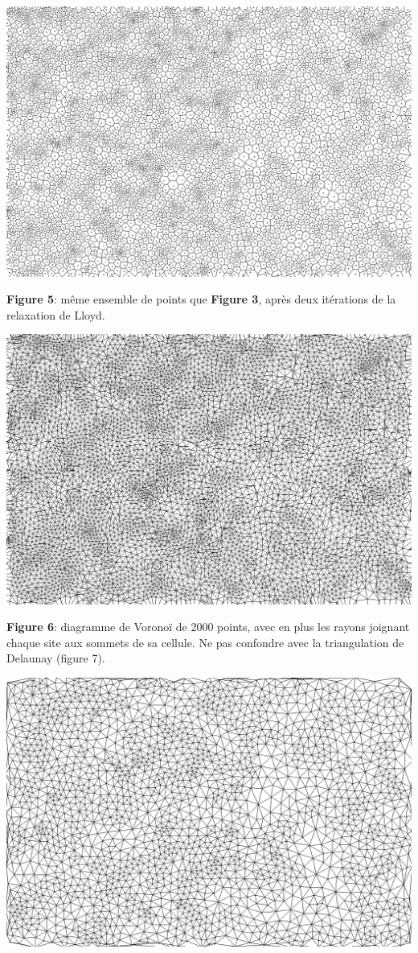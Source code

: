 \documentclass[a4paper, 10pt]{article}
\begin{document}
\begin{center}
\includegraphics[scale=0.2]{Lloyd2.png}
  
\textbf{Figure 5}: même ensemble de points que \textbf{Figure 3}, après deux itérations de la relaxation de Lloyd.  

\includegraphics[scale=0.2]{AretesPoutres2000.png}
  
\textbf{Figure 6}: diagramme de Voronoï de 2000 points, avec en plus les rayons joignant chaque site aux sommets de sa cellule. Ne pas confondre avec la triangulation de Delaunay (figure 7).  
  
\includegraphics[scale=0.2]{DelaunayTriangulation2000.png}
  

\end{center}
\end{document}
